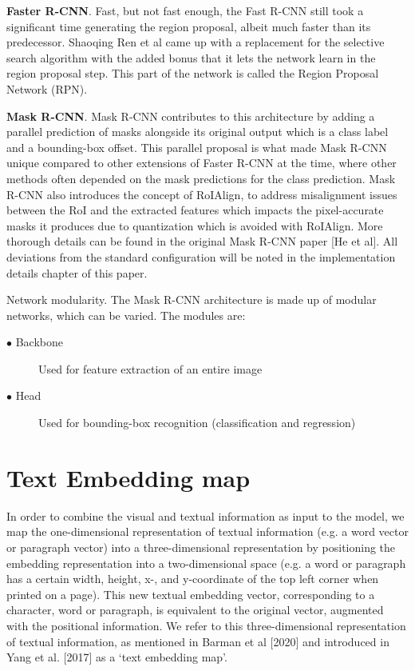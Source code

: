 \documentclass[english, bibtex]{kththesis}
\begin{document}
\textbf{Faster R-CNN}. Fast, but not fast enough, the Fast R-CNN still took a significant time generating the region proposal, albeit much faster than its predecessor. Shaoqing Ren et al came up with a replacement for the selective search algorithm with the added bonus that it lets the network learn in the region proposal step. This part of the network is called the Region Proposal Network (RPN). 

\textbf{Mask R-CNN}. Mask R-CNN contributes to this architecture by adding a parallel prediction of masks alongside its original output which is a class label and a bounding-box offset. This parallel proposal is what made Mask R-CNN unique compared to other extensions of Faster R-CNN at the time, where other methods often depended on the mask predictions for the class prediction. Mask R-CNN also introduces the concept of RoIAlign, to address misalignment issues between the RoI and the extracted features which impacts the pixel-accurate masks it produces due to quantization which is avoided with RoIAlign. More thorough details can be found in the original Mask R-CNN paper [He et al]. All deviations from the standard configuration will be noted in the implementation details chapter of this paper.

Network modularity. The Mask R-CNN architecture is made up of modular networks, which can be varied. The modules are:

\begin{description}
\item[$\bullet$ Backbone] Used for feature extraction of an entire image
\item[$\bullet$ Head] Used for bounding-box recognition (classification and regression)
\end{description}

\section{Text Embedding map}

In order to combine the visual and textual information as input to the model, we map the one-dimensional representation of textual information (e.g. a word vector or paragraph vector) into a three-dimensional representation by positioning the embedding representation into a two-dimensional space (e.g. a word or paragraph has a certain width, height, x-, and y-coordinate of the top left corner when printed on a page). This new textual embedding vector, corresponding to a character, word or paragraph, is equivalent to the original vector, augmented with the positional information. We refer to this three-dimensional representation of textual information, as mentioned in Barman et al [2020] and introduced in Yang et al. [2017] as a ‘text embedding map’.
\end{document}
